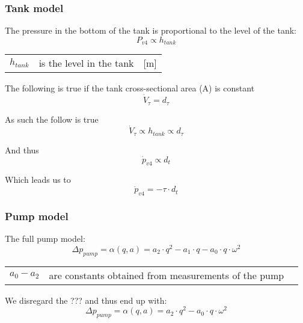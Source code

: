 \documentclass{article}
\begin{document}
\subsubsection{Tank model}
The pressure in the bottom of the tank is proportional to the level of the tank:
\begin{equation}
	P_{v4} \propto h_{tank}
\end{equation}

\begin{center}
	\begin{tabular}{l p{8cm} l}
		$h_{tank}$ & is the level in the tank & [\si{m}]\\
	\end{tabular}
\end{center}

The following is true if the tank cross-sectional area (A) is constant
\begin{equation}
	\dot V_{\tau} = d_{\tau}
\end{equation}

As such the follow is true
\begin{equation}
		\dot V_{\tau} \propto h_{tank} \propto d_{\tau}
\end{equation}

And thus
\begin{equation}
	\dot p_{v4} \propto d_t
\end{equation}

Which leads us to
\begin{equation}
	\dot p_{v4} = -\tau \cdot d_t
\end{equation}


\subsubsection{Pump model}

The full pump model:
\begin{equation}
	\Delta p_{pump}  = \alpha(q, a) = a_2 \cdot q^2 - a_1 \cdot q - a_0 \cdot q \cdot \omega^2
\end{equation}

\begin{center}
	\begin{tabular}{l p{8cm} l}
		$a_0 - a_2$ & are constants obtained from measurements of the pump \\
	\end{tabular}
\end{center}

We disregard the ??? and thus end up with:
\begin{equation}
	\Delta p_{pump}  = \alpha(q, a) = a_2 \cdot q^2 - a_0 \cdot q \cdot \omega^2
\end{equation}
\end{document}

